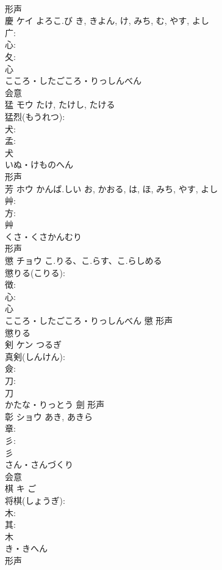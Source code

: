 \documentclass[8pt]{extreport}
\begin{document}
\begin{CJK}{UTF8}{min}
\\	形声 
\\	慶	ケイ	よろこ.び	き, きよん, け, みち, む, やす, よし	
\\	广: 
\\	心: 
\\	夂: 
\\	心	
\\	こころ・したごころ・りっしんべん	
\\	会意 
\\	猛	モウ		たけ, たけし, たける	
\\	猛烈(もうれつ): 
\\	犬: 
\\	孟: 
\\	犬	
\\	いぬ・けものへん	
\\	形声 
\\	芳	ホウ	かんば.しい	お, かおる, は, ほ, みち, やす, よし	
\\	艸: 
\\	方: 
\\	艸	
\\	くさ・くさかんむり	
\\	形声 
\\	懲	チョウ	こ.りる、こ.らす、こ.らしめる		
\\	懲りる(こりる): 
\\	徴: 
\\	心: 
\\	心	
\\	こころ・したごころ・りっしんべん	懲	形声 
\\	懲りる 
\\	剣	ケン	つるぎ		
\\	真剣(しんけん): 
\\	僉: 
\\	刀: 
\\	刀	
\\	かたな・りっとう	劍	形声 
\\	彰	ショウ		あき, あきら	
\\	章: 
\\	彡: 
\\	彡	
\\	さん・さんづくり	
\\	会意 
\\	棋	キ	ご		
\\	将棋(しょうぎ): 
\\	木: 
\\	其: 
\\	木	
\\	き・きへん	
\\	形声 

\end{CJK}
\end{document}

